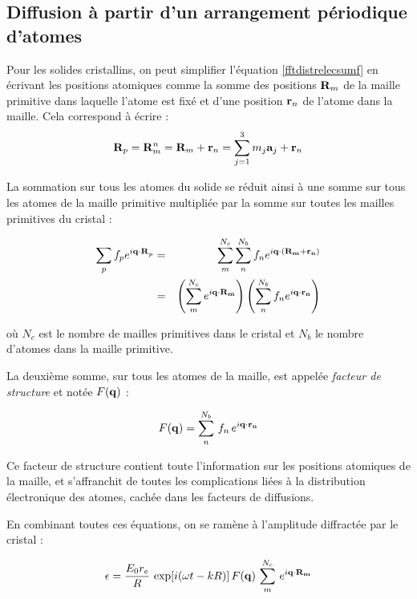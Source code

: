 \subsection{Diffusion à partir d'un arrangement périodique d'atomes}

Pour les solides cristallins, on peut simplifier l'équation \ref{fftdistrelecsumf} en écrivant les positions atomiques comme la somme des
positions $\mathbf{R}_m$ de la maille primitive dans laquelle l'atome est fixé
et d'une position $\mathbf{r}_n$ de l'atome dans la maille. Cela correspond à
écrire :
\begin{equation}
    \mathbf{R}_p = \mathbf{R}_m^n = \mathbf{R}_m + \mathbf{r}_n =
    \sum_{j=1}^3 m_j \mathbf{a}_j + \mathbf{r}_n
\end{equation}

La sommation sur tous les atomes du solide se réduit ainsi à une somme sur tous
les atomes de la maille primitive multipliée par la somme sur toutes les mailles primitives
du cristal :

\begin{eqnarray}
    \sum_p f_p e^{i\mathbf{q \cdot R}_p} & = & \sum_m^{N_c} \sum_n^{N_b}
    f_n e^{i\mathbf{q\cdot(R_m + r_n)}}\\
    & = & \left( \sum_m^{N_c} e^{i\mathbf{q\cdot R_m}} \right)
    \left( \sum_n^{N_b} f_n e^{i\mathbf{q\cdot r_n}} \right)
\end{eqnarray}

où $N_c$ est le nombre de mailles primitives dans le cristal et $N_b$ le nombre
d'atomes dans la maille primitive.

La deuxième somme, sur tous les atomes de la maille, est appelée \emph{facteur de structure} et notée $F(\mathbf{q})$ :

\begin{equation}
    F(\mathbf{q}) = \sum_n^{N_b}\, f_n\, e^{i \mathbf{q \cdot r_n}}
\end{equation}

Ce facteur de structure contient toute l'information sur les positions atomiques
de la maille, et s'affranchit de toutes les complications liées à la distribution
électronique des atomes, cachée dans les facteurs de diffusions.

En combinant toutes ces équations, on se ramène à l'amplitude diffractée par le
cristal :

\begin{equation}
    \epsilon = \frac{E_0 r_e}{R}\, \exp[i(\omega t - k R)]\, F(\mathbf{q})\, \sum_m^{N_c}\, e^{i\mathbf{q\cdot R_m}}
    \label{ampdiffract}
\end{equation}

